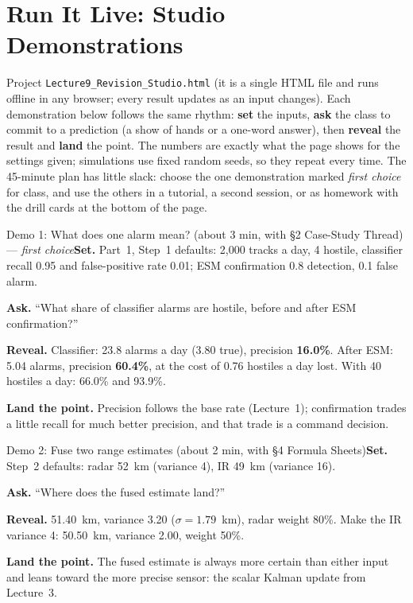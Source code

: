 \documentclass[11pt]{article}
\begin{document}
\section{Run It Live: Studio Demonstrations}\label{sec:live}

Project \texttt{Lecture9\_Revision\_Studio.html} (it is a single HTML file and runs offline in any browser; every result updates as an input changes). Each demonstration below follows the same rhythm: \textbf{set} the inputs, \textbf{ask} the class to commit to a prediction (a show of hands or a one-word answer), then \textbf{reveal} the result and \textbf{land} the point. The numbers are exactly what the page shows for the settings given; simulations use fixed random seeds, so they repeat every time. The 45-minute plan has little slack: choose the one demonstration marked \emph{first choice} for class, and use the others in a tutorial, a second session, or as homework with the drill cards at the bottom of the page.

\begin{live}{Demo 1: What does one alarm mean? (about 3 min, with \S2 Case-Study Thread) --- \emph{first choice}}\textbf{Set.} Part~1, Step~1 defaults: 2,000 tracks a day, 4 hostile, classifier recall 0.95 and false-positive rate 0.01; ESM confirmation 0.8 detection, 0.1 false alarm.\par\smallskip\textbf{Ask.} ``What share of classifier alarms are hostile, before and after ESM confirmation?''\par\smallskip\textbf{Reveal.} Classifier: 23.8 alarms a day (3.80 true), precision \textbf{16.0\%}. After ESM: 5.04 alarms, precision \textbf{60.4\%}, at the cost of 0.76 hostiles a day lost. With 40 hostiles a day: 66.0\% and 93.9\%.\par\smallskip\textbf{Land the point.} Precision follows the base rate (Lecture~1); confirmation trades a little recall for much better precision, and that trade is a command decision.\end{live}

\begin{live}{Demo 2: Fuse two range estimates (about 2 min, with \S4 Formula Sheets)}\textbf{Set.} Step~2 defaults: radar 52~km (variance 4), IR 49~km (variance 16).\par\smallskip\textbf{Ask.} ``Where does the fused estimate land?''\par\smallskip\textbf{Reveal.} 51.40~km, variance 3.20 ($\sigma=1.79$~km), radar weight 80\%. Make the IR variance 4: 50.50~km, variance 2.00, weight 50\%.\par\smallskip\textbf{Land the point.} The fused estimate is always more certain than either input and leans toward the more precise sensor: the scalar Kalman update from Lecture~3.\end{live}
\end{document}

